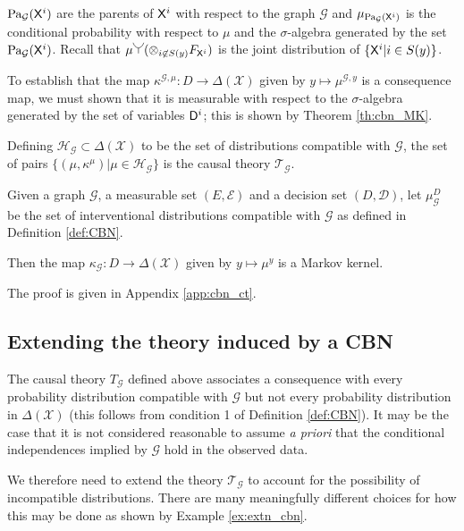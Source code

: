 $\text{Pa}_{\mathcal{G}}(\mathsf{X}^i)$ are the parents of $\mathsf{X}^i$ with respect to the graph $\mathcal{G}$ and $\mu_{\text{Pa}_{\mathcal{G}}(\mathsf{X}^i)}$ is the conditional probability with respect to $\mu$ and the $\sigma$-algebra generated by the set $\text{Pa}_{\mathcal{G}}(\mathsf{X}^i)$. Recall that $\mu \splitter{0.15}(\otimes_{i\not\in S(y)} F_{\RV{X}^i})$ is the joint distribution of $\{\mathsf{X}^i|i\in S(y)\}$.

To establish that the map $\kappa^{\mathcal{G},\mu}:D\to \Delta(\mathcal{X})$ given by $y\mapsto \mu^{\mathcal{G},y}$ is a consequence map, we must shown that it is measurable with respect to the $\sigma$-algebra generated by the set of variables $\mathsf{D}^i$; this is shown by Theorem \ref{th:cbn_MK}. 

Defining $\mathscr{H}_{\mathcal{G}}\subset\Delta(\mathcal{X})$ to be the set of distributions compatible with $\mathcal{G}$, the set of pairs $\{(\mu, \kappa^\mu)|\mu\in \mathscr{H}_{\mathcal{G}}\}$ is the causal theory $\mathscr{T}_\mathcal{G}$.

\begin{theorem}\label{th:cbn_MK}
Given a graph $\mathcal{G}$, a measurable set $(E,\mathcal{E})$ and a decision set $(D,\mathcal{D})$, let $\mu^D_\mathcal{G}$ be the set of interventional distributions compatible with $\mathcal{G}$ as defined in Definition \ref{def:CBN}. 

Then the map $\kappa_{\mathcal{G}}:D\to \Delta(\mathcal{X})$ given by $y\mapsto \mu^y$ is a Markov kernel.
\end{theorem}

The proof is given in Appendix \ref{app:cbn_ct}.



\subsection{Extending the theory induced by a CBN}

The causal theory $T_{\mathcal{G}}$ defined above associates a consequence with every probability distribution compatible with $\mathcal{G}$ but not every probability distribution in $\Delta(\mathcal{X})$ (this follows from condition 1 of Definition \ref{def:CBN}). It may be the case that it is not considered reasonable to assume \emph{a priori} that the conditional independences implied by $\mathcal{G}$ hold in the observed data.

We therefore need to extend the theory $\mathscr{T}_{\mathcal{G}}$ to account for the possibility of incompatible distributions. There are many meaningfully different choices for how this may be done as shown by Example \ref{ex:extn_cbn}.

